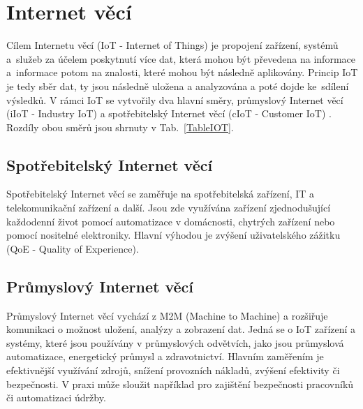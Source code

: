 \chapter{Internet věcí}
\label{ChapterInternetVeci}

Cílem Internetu věcí (IoT - Internet of Things) je propojení zařízení, systémů a~služeb za účelem poskytnutí více dat, která mohou být převedena na informace a~informace potom na znalosti, které mohou být následně aplikovány. Princip IoT je tedy sběr dat, ty jsou následně uložena a analyzována a poté dojde ke~sdílení výsledků. V rámci IoT se vytvořily dva hlavní směry, průmyslový Internet věcí (iIoT - Industry IoT) a spotřebitelský Internet věcí (cIoT - Customer IoT) \cite{iot_svet_hardware_internet_veci, iot_pohanka_internet_veci}. Rozdíly obou směrů jsou shrnuty v Tab.~\ref{TableIOT}.

\section{Spotřebitelský Internet věcí}
Spotřebitelský Internet věcí se zaměřuje na spotřebitelská zařízení, IT a telekomunikační zařízení a další. Jsou zde využívána zařízení zjednodušující každodenní život pomocí automatizace v domácnosti, chytrých zařízení nebo pomocí nositelné elektroniky. Hlavní výhodou je zvýšení uživatelského zážitku (QoE - Quality of Experience).

\section{Průmyslový Internet věcí}
Průmyslový Internet věcí vychází z M2M (Machine to Machine) a rozšiřuje komunikaci o možnost uložení, analýzy a zobrazení dat. Jedná se o IoT zařízení a systémy, které jsou používány v průmyslových odvětvích, jako jsou průmyslová automatizace, energetický průmysl a zdravotnictví. Hlavním zaměřením je efektivnější využívání zdrojů, snížení provozních nákladů, zvýšení efektivity či bezpečnosti. V praxi může sloužit například pro zajištění bezpečnosti pracovníků či automatizaci údržby. 


